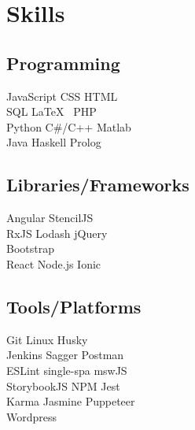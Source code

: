 \documentclass[]{plushcv}
\begin{document}
\begin{minipage}[t]{0.25\textwidth} 


\section{Skills}

\subsection{Programming}
\sectionsep
{}
JavaScript \textbullet{} CSS \textbullet{} HTML \\
\sectionsep
{}
SQL \textbullet{} \LaTeX\ \textbullet{} PHP \\
Python \textbullet{} C\#/C++ \textbullet{} Matlab \\
\sectionsep
{}
Java \textbullet{} Haskell \textbullet{} Prolog \\
\sectionsep
\sectionsep

\subsection{Libraries/Frameworks}
\sectionsep
{}
Angular \textbullet{} StencilJS \\
\sectionsep
{}
RxJS \textbullet{} Lodash \textbullet{} jQuery \\
Bootstrap \\
\sectionsep
{}
React \textbullet{} Node.js \textbullet{} Ionic \\
\sectionsep
\sectionsep

\subsection{Tools/Platforms}
\sectionsep
Git \textbullet{} Linux \textbullet{} Husky \\
Jenkins \textbullet{} Sagger \textbullet{} Postman \\
ESLint \textbullet{} single-spa \textbullet{} mswJS \\ 
StorybookJS \textbullet{} NPM \textbullet{} Jest \\
Karma \textbullet{} Jasmine \textbullet{} Puppeteer \\
Wordpress \\


\end{minipage}
\end{document}
